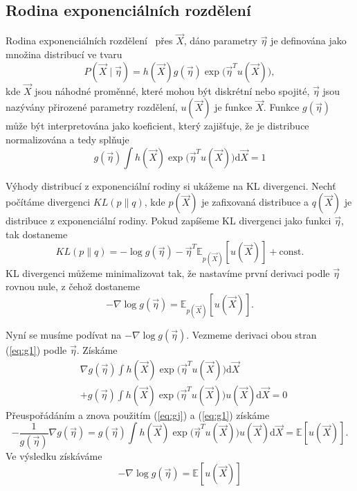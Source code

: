 \subsection{Rodina exponenciálních rozdělení}
\label{sec:expfam}

Rodina exponenciálních rozdělení~\cite{bernardo2009bayesian} přes $\vec{X}$, dáno parametry $\vec\eta$ je definována jako množina distribucí ve tvaru
\begin{equation}
P(\vec{X} \mid \vec\eta) = h(\vec{X}) g(\vec\eta) \exp \big(\vec\eta^T u(\vec{X})\big),
\label{eq:gj}
\end{equation}
kde $\vec{X}$ jsou náhodné proměnné, které mohou být diskrétní nebo spojité, $\vec\eta$ jsou nazývány přirozené parametry rozdělení, $u(\vec{X})$ je funkce $\vec{X}$.
Funkce $g(\vec\eta)$ může být interpretována jako koeficient, který zajišťuje, že je distribuce normalizována a tedy splňuje
\begin{equation}
g(\vec\eta) \int h(\vec{X}) \exp \big(\vec\eta^T u(\vec{X})\big) \mathrm{d}\vec{X} = 1
\label{eq:g1}
\end{equation}

Výhody distribucí z exponenciální rodiny si ukážeme na KL divergenci.
Nechť počítáme divergenci $KL(p \| q)$, kde $p(\vec{X})$ je zafixovaná distribuce a $q(\vec{X})$ je distribuce z exponenciální rodiny.
Pokud zapíšeme KL divergenci jako funkci $\vec\eta$, tak dostaneme
\begin{equation}
KL(p \| q) = - \log g(\vec\eta) - \vec\eta^T \mathbb{E}_{p(\vec{X})}[u(\vec{X})] + \mathrm{const}.
\end{equation}
KL divergenci můžeme minimalizovat tak, že nastavíme první derivaci podle $\vec\eta$ rovnou nule, z čehož dostaneme
\begin{equation}
-\nabla \log g(\vec\eta) = \mathbb{E}_{p(\vec{X})}[u(\vec{X})].
\label{eq:kl}
\end{equation}

Nyní se musíme podívat na $- \nabla \log g(\vec\eta)$.
Vezmeme derivaci obou stran (\ref{eq:g1}) podle $\vec\eta$.
Získáme
\begin{align}
& \nabla g(\vec\eta) \int h(\vec{X}) \exp \big(\vec\eta^T u(\vec{X}) \big) \mathrm{d}\vec{X} \\
& + g(\vec\eta) \int h(\vec{X}) \exp \big(\vec\eta^T u(\vec{X})\big) u(\vec{X}) \mathrm{d}\vec{X} = 0 \nonumber
\end{align}
Přeuspořádáním a znova použitím (\ref{eq:gj}) a (\ref{eq:g1}) získáme
\begin{equation}
-\frac{1}{g(\vec\eta)}\nabla g(\vec\eta)
= g(\vec\eta) \int h(\vec{X}) \exp\big(\vec\eta^T u(\vec{X})\big) u(\vec{X}) \mathrm{d}\vec{X} = \mathbb{E}[u(\vec{X})].
\end{equation}
Ve výsledku získáváme 
\begin{equation}
- \nabla \log g(\vec\eta) = \mathbb{E}[u(\vec{X})]
\label {eq:ge}
\end{equation}

